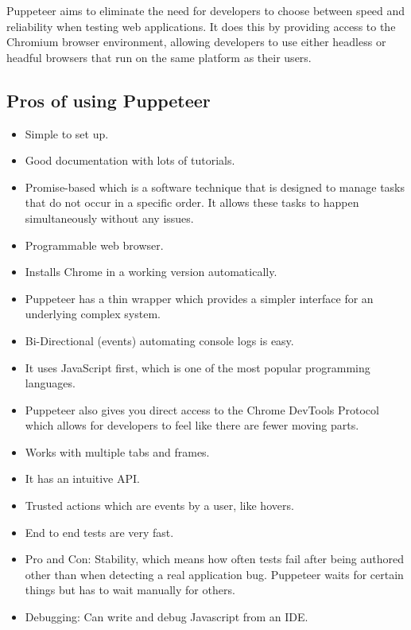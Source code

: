\documentclass[12pt,a4paper,titlepage]{report}
\begin{document}
Puppeteer aims to eliminate the need for developers to choose between speed and reliability when testing web applications. 
It does this by providing access to the Chromium browser environment, allowing developers to use either headless or headful browsers that run on the same platform as their users.
\subsection{Pros of using Puppeteer}

\begin{itemize}
 \item Simple to set up.
 \item Good documentation with lots of tutorials.
 \item Promise-based which is a software technique that is designed to manage tasks that do not occur in a specific order. It allows these tasks to happen simultaneously without any issues.
 \item Programmable web browser.
 \item Installs Chrome in a working version automatically.
 \item Puppeteer has a thin wrapper which provides a simpler interface for an underlying complex system.
 \item Bi-Directional (events) \- automating console logs is easy.
 \item It uses JavaScript first, which is one of the most popular programming languages.
 \item Puppeteer also gives you direct access to the Chrome DevTools Protocol which allows for developers to feel like there are fewer moving parts.
 \item Works with multiple tabs and frames. 
 \item It has an intuitive API.
 \item Trusted actions which are events by a user, like hovers.
 \item End to end tests are very fast.
 \item Pro and Con: Stability, which means how often tests fail after being authored other than when detecting a real application bug. Puppeteer waits for certain things but has to wait manually for others. 
 \item Debugging: Can write and debug Javascript from an IDE\@.
\end{itemize}
\end{document}

